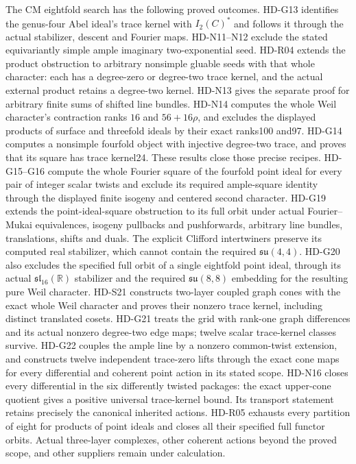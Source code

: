 The CM eightfold search has the following proved outcomes.
HD-G13 identifies the genus-four Abel ideal's trace kernel with
$I_2(C)^*$ and follows it through the actual stabilizer, descent
and Fourier maps. HD-N11--N12 exclude the stated equivariantly
simple ample imaginary two-exponential seed. HD-R04 extends the product
obstruction to arbitrary nonsimple gluable seeds with that whole character:
each has a degree-zero or degree-two trace kernel, and the actual external
product retains a degree-two kernel. HD-N13 gives the
separate proof for arbitrary finite sums of shifted line bundles.
HD-N14 computes the whole Weil character's contraction ranks
$16$ and $56+16\rho$, and excludes the displayed products of
surface and threefold ideals by their exact ranks100 and97.
HD-G14 computes a nonsimple fourfold object with injective
degree-two trace, and proves that its square has trace kernel24.
These results close those precise recipes. HD-G15--G16 compute the whole
Fourier square of the fourfold point ideal for every pair of integer
scalar twists and exclude its required ample-square identity through
the displayed finite isogeny and centered second character.
HD-G19 extends the point-ideal-square obstruction to its full orbit
under actual Fourier--Mukai equivalences, isogeny pullbacks and
pushforwards, arbitrary line bundles, translations, shifts and duals.
The explicit Clifford intertwiners preserve its computed real
stabilizer, which cannot contain the required $\mathfrak{su}(4,4)$.
HD-G20 also excludes the specified full orbit of a single eightfold point
ideal, through its actual $\mathfrak{sl}_{16}(\mathbb R)$ stabilizer and
the required $\mathfrak{su}(8,8)$ embedding for the resulting pure Weil
character. HD-S21 constructs two-layer coupled graph cones with the exact whole
Weil character and proves their nonzero trace kernel, including
distinct translated cosets. HD-G21 treats the grid with rank-one graph
differences and its actual nonzero degree-two edge maps; twelve scalar
trace-kernel classes survive. HD-G22 couples the ample line by a nonzero
common-twist extension, and constructs twelve independent trace-zero
lifts through the exact cone maps for every differential and coherent
point action in its stated scope. HD-N16 closes every differential in the six differently twisted
packages: the exact upper-cone quotient gives a positive universal
trace-kernel bound. Its transport statement retains precisely the
canonical inherited actions. HD-R05 exhausts every partition of eight
for products of point ideals and closes all their specified full
functor orbits. Actual three-layer complexes, other coherent actions
beyond the proved scope, and other suppliers remain under calculation.

